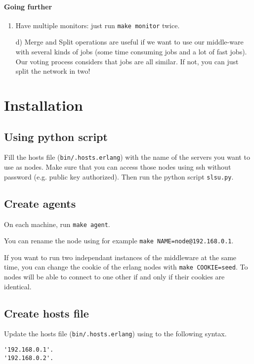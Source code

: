\documentclass[a4paper, 11pt]{article}
\begin{document}
\paragraph{Going further}
\begin{enumerate}[label=\alph*)]
  \item Have multiple monitors: just run \verb|make monitor| twice.
  \item[d)] Merge and Split operations are useful if we want to use our middle-ware with several kinds of jobs (some time consuming jobs and a lot of fast jobs). Our voting process considers that jobs are all similar. If not, you can just split the network in two!
\end{enumerate}

\newpage

\section{Installation}

\subsection{Using python script}

Fill the hosts file (\verb|bin/.hosts.erlang|) with the name of the servers you want to use as nodes. Make sure that you can access those nodes using ssh without password (e.g. public key authorized). Then run the python script \verb|slsu.py|.

\subsection{Create agents}

On each machine, run \verb|make agent|.

\medskip\noindent You can rename the node using for example \verb|make NAME=node@192.168.0.1|.

\medskip\noindent If you want to run two independant instances of the middleware at the same time, you can change the cookie of the erlang nodes with \verb|make COOKIE=seed|. To nodes will be able to connect to one other if and only if their cookies are identical.

\subsection{Create hosts file}

Update the hosts file (\verb|bin/.hosts.erlang|) using to the following syntax.
\begin{verbatim}
'192.168.0.1'.
'192.168.0.2'.
\end{verbatim}
\end{document}
